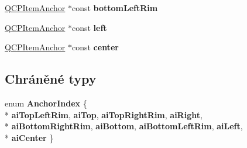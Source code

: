 \begin{DoxyCompactItemize}
\item 
\hypertarget{classQCPItemEllipse_a31f31a9e9f9098c90fb47573094276c5}{}\hyperlink{classQCPItemAnchor}{Q\+C\+P\+Item\+Anchor} $\ast$const {\bfseries bottom\+Left\+Rim}\label{classQCPItemEllipse_a31f31a9e9f9098c90fb47573094276c5}

\item 
\hypertarget{classQCPItemEllipse_aa259cd03efaedf60cf5b1019b20e4f2b}{}\hyperlink{classQCPItemAnchor}{Q\+C\+P\+Item\+Anchor} $\ast$const {\bfseries left}\label{classQCPItemEllipse_aa259cd03efaedf60cf5b1019b20e4f2b}

\item 
\hypertarget{classQCPItemEllipse_a8b6dd0e854f99239c5806ffdf2f590b3}{}\hyperlink{classQCPItemAnchor}{Q\+C\+P\+Item\+Anchor} $\ast$const {\bfseries center}\label{classQCPItemEllipse_a8b6dd0e854f99239c5806ffdf2f590b3}

\end{DoxyCompactItemize}
\subsection*{Chráněné typy}
\begin{DoxyCompactItemize}
\item 
\hypertarget{classQCPItemEllipse_a415009889543169f35b70795f415e45e}{}enum {\bfseries Anchor\+Index} \{ \\*
{\bfseries ai\+Top\+Left\+Rim}, 
{\bfseries ai\+Top}, 
{\bfseries ai\+Top\+Right\+Rim}, 
{\bfseries ai\+Right}, 
\\*
{\bfseries ai\+Bottom\+Right\+Rim}, 
{\bfseries ai\+Bottom}, 
{\bfseries ai\+Bottom\+Left\+Rim}, 
{\bfseries ai\+Left}, 
\\*
{\bfseries ai\+Center}
 \}\label{classQCPItemEllipse_a415009889543169f35b70795f415e45e}

\end{DoxyCompactItemize}
